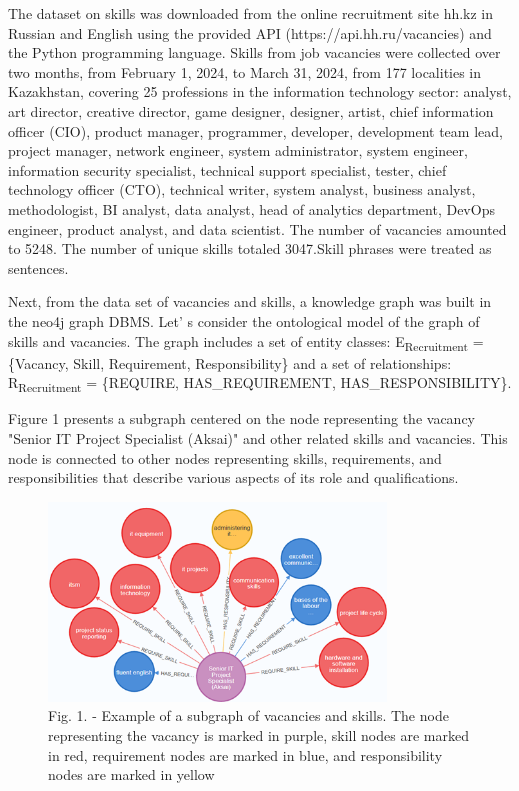 \begin{multicols}{2}
The dataset on skills was downloaded from the online recruitment site
hh.kz in Russian and English using the provided API
(https://api.hh.ru/vacancies) and the Python programming language.
Skills from job vacancies were collected over two months, from February
1, 2024, to March 31, 2024, from 177 localities in Kazakhstan, covering
25 professions in the information technology sector: analyst, art
director, creative director, game designer, designer, artist, chief
information officer (CIO), product manager, programmer, developer,
development team lead, project manager, network engineer, system
administrator, system engineer, information security specialist,
technical support specialist, tester, chief technology officer (CTO),
technical writer, system analyst, business analyst, methodologist, BI
analyst, data analyst, head of analytics department, DevOps engineer,
product analyst, and data scientist. The number of vacancies amounted to
5248. The number of unique skills totaled 3047.Skill phrases were
treated as sentences.

Next, from the data set of vacancies and skills, a knowledge graph was
built in the neo4j graph DBMS. Let' s consider the
ontological model of the graph of skills and vacancies. The graph
includes a set of entity classes: E\textsubscript{Recruitment} =
\{Vacancy, Skill, Requirement, Responsibility\} and a set of
relationships: R\textsubscript{Recruitment} = \{REQUIRE,
HAS\_REQUIREMENT, HAS\_RESPONSIBILITY\}.

Figure 1 presents a subgraph centered on the node representing the
vacancy "Senior IT Project Specialist (Aksai)" and other related skills
and vacancies. This node is connected to other nodes representing
skills, requirements, and responsibilities that describe various aspects
of its role and qualifications.
\end{multicols}

\begin{figure}[H]
	\centering
	\includegraphics[width=0.8\textwidth]{media/ict/image104}
	\caption*{Fig. 1. - Example of a subgraph of vacancies and skills. The
node representing the vacancy is marked in purple, skill nodes are
marked in red, requirement nodes are marked in blue, and responsibility
nodes are marked in yellow}
\end{figure}

